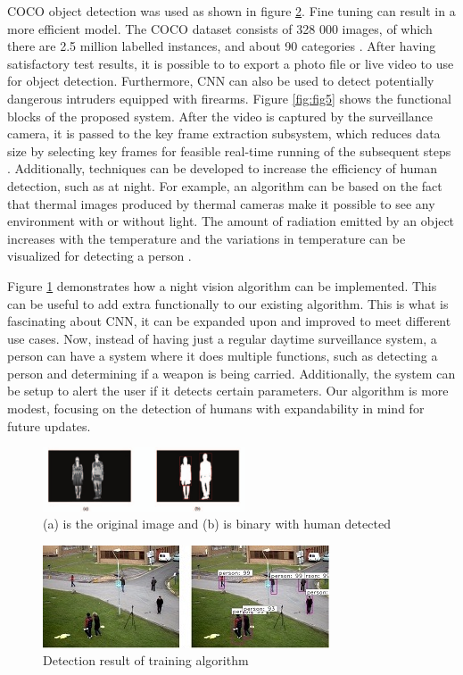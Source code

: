COCO object detection was used as shown in figure \ref{fig:fig4}. Fine tuning can result in a more efficient model. The COCO dataset consists of 328 000 images, of which there are 2.5 million labelled instances, and about 90 categories \cite{Pienaar}. After having satisfactory test results, it is possible to to export a photo file or live video to use for  object detection. Furthermore, CNN can also be used to detect potentially dangerous intruders equipped with firearms. Figure \ref{fig:fig5} shows the functional blocks of the proposed system. After the video is captured by the surveillance camera, it is passed to the key frame extraction subsystem, which reduces data size by selecting key frames for feasible real-time running of the subsequent steps \cite{Xu}. Additionally, techniques can be developed to increase the efficiency of human detection, such as at night. For example, an algorithm can be based on the fact that thermal images produced by thermal cameras make it possible to see any environment with or without light. The amount of radiation emitted by an object increases
with the temperature and the variations in temperature can be visualized for detecting a person \cite{Sharma}.

Figure \ref{fig:fig6} demonstrates how a night vision algorithm can be implemented. This can be useful to add extra functionally to our existing algorithm. This is what is fascinating about CNN, it can be expanded upon and improved to meet different use cases. Now, instead of having just a regular daytime surveillance system, a person can have a system where it does multiple functions, such as detecting a person and determining if a weapon is being carried. Additionally, the system can be setup to alert the user if it detects certain parameters. Our algorithm is more modest, focusing on the detection of humans with expandability in mind for future updates.

\begin{figure}
    \centering
    \includegraphics[width=6cm]{Security Object Detection, Surveillance/Latex/figures/fig6.png}
    \caption{(a) is the original image and (b) is binary with human detected \cite{Sharma}}
    \label{fig:fig6}
\end{figure}

\begin{figure}
    \centering
    \includegraphics[width=8.5cm]{Security Object Detection, Surveillance/Latex/figures/fig4.jpg}
    \caption{Detection result of training algorithm \cite{Dinama}}
    \label{fig:fig4}
\end{figure}

 